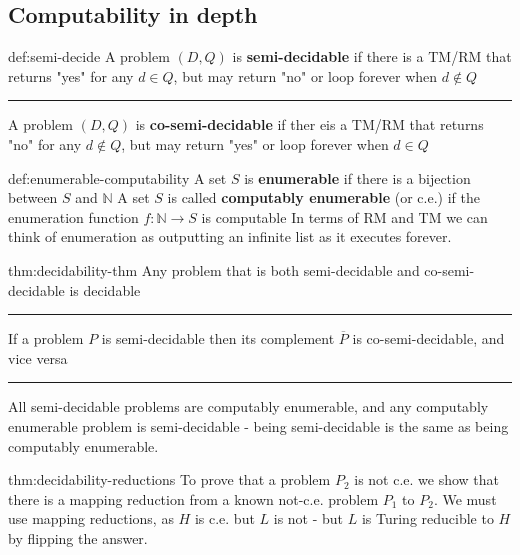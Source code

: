 \documentclass[landscape, 8pt]{extarticle}
\begin{document}
\begin{multicols}{3}
\newpage


\subsection*{Computability in depth}

\begin{dfn}{def:semi-decide}{}
A problem $(D, Q)$ is \textbf{semi-decidable} if there is a TM/RM that returns "yes" for any $d\in Q$, but may return "no" or loop forever when $d\not\in Q$
\newline
\noindent\rule{\textwidth}{0.2pt}
A problem $(D, Q)$ is \textbf{co-semi-decidable} if ther eis a TM/RM that returns "no" for any $d\not\in Q$, but may return "yes" or loop forever when $d\in Q$
\end{dfn}


\begin{dfn}{def:enumerable-computability}{}
A set $S$ is \textbf{enumerable} if there is a bijection between $S$ and $\mathbb{N}$
\newline
A set $S$ is called \textbf{computably enumerable} (or c.e.) if the enumeration function $f : \mathbb{N} \to S$ is computable \newline
In terms of RM and TM we can think of enumeration as outputting an infinite
list as it executes forever.
\end{dfn}


\begin{thm}{thm:decidability-thm}{}
Any problem that is both semi-decidable and co-semi-decidable is decidable
\newline
\noindent\rule{\textwidth}{0.2pt}
If a problem $P$ is semi-decidable then its complement $\overline{P}$ is co-semi-decidable, and vice versa
\newline
\noindent\rule{\textwidth}{0.2pt}
All semi-decidable problems are computably enumerable, and any computably enumerable problem is semi-decidable - being semi-decidable is the same as being computably enumerable.
\end{thm}

\begin{thm}{thm:decidability-reductions}{}
To prove that a problem $P_{2}$ is not c.e. we show that there is a mapping reduction from a known not-c.e. problem $P_{1}$ to $P_{2}$. We must use mapping reductions, as $H$ is c.e. but $L$ is not - but $L$ is Turing reducible to $H$ by flipping the answer.


\end{thm}
\end{multicols}
\end{document}
